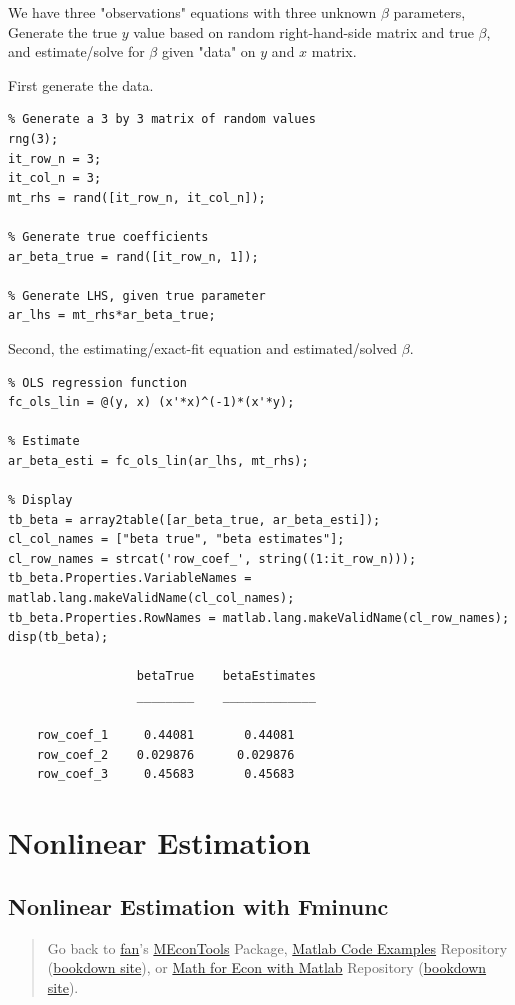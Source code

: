 \documentclass[
]{book}
\begin{document}
We have three "observations" equations with three unknown \(\beta\)
parameters, Generate the true \(y\) value based on random right-hand-side
matrix and true \(\beta\), and estimate/solve for \(\beta\) given "data"
on \(y\) and \(x\) matrix.

First generate the data.

\begin{verbatim}
% Generate a 3 by 3 matrix of random values
rng(3);
it_row_n = 3;
it_col_n = 3;
mt_rhs = rand([it_row_n, it_col_n]);

% Generate true coefficients
ar_beta_true = rand([it_row_n, 1]);

% Generate LHS, given true parameter
ar_lhs = mt_rhs*ar_beta_true;
\end{verbatim}

Second, the estimating/exact-fit equation and estimated/solved \(\beta\).

\begin{verbatim}
% OLS regression function
fc_ols_lin = @(y, x) (x'*x)^(-1)*(x'*y);

% Estimate
ar_beta_esti = fc_ols_lin(ar_lhs, mt_rhs);

% Display
tb_beta = array2table([ar_beta_true, ar_beta_esti]);
cl_col_names = ["beta true", "beta estimates"];
cl_row_names = strcat('row_coef_', string((1:it_row_n)));
tb_beta.Properties.VariableNames = matlab.lang.makeValidName(cl_col_names);
tb_beta.Properties.RowNames = matlab.lang.makeValidName(cl_row_names);
disp(tb_beta);

                  betaTrue    betaEstimates
                  ________    _____________

    row_coef_1     0.44081       0.44081   
    row_coef_2    0.029876      0.029876   
    row_coef_3     0.45683       0.45683   
\end{verbatim}

\hypertarget{nonlinear-estimation}{%
\section{Nonlinear Estimation}\label{nonlinear-estimation}}

\hypertarget{nonlinear-estimation-with-fminunc}{%
\subsection{Nonlinear Estimation with Fminunc}\label{nonlinear-estimation-with-fminunc}}

\begin{quote}
Go back to \href{http://fanwangecon.github.io/}{fan}'s \href{https://fanwangecon.github.io/MEconTools/}{MEconTools} Package, \href{https://fanwangecon.github.io/M4Econ/}{Matlab Code Examples} Repository (\href{https://fanwangecon.github.io/M4Econ/bookdown}{bookdown site}), or \href{https://fanwangecon.github.io/Math4Econ/}{Math for Econ with Matlab} Repository (\href{https://fanwangecon.github.io/Math4Econ/bookdown}{bookdown site}).
\end{quote}
\end{document}
